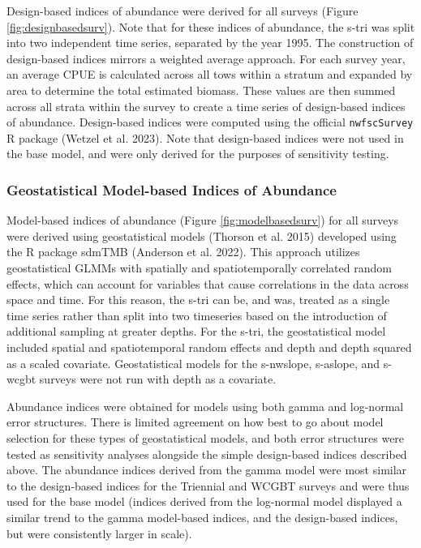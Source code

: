 \documentclass[11pt,
  english,
  letterpaper,
]{article}
\begin{document}
Design-based indices of abundance were derived for all surveys (Figure \ref{fig:designbasedsurv}). Note that for these indices of abundance, the \gls{s-tri} was split into two independent time series, separated by the year 1995. The construction of design-based indices mirrors a weighted average approach. For each survey year, an average CPUE is calculated across all tows within a stratum and expanded by area to determine the total estimated biomass. These values are then summed across all strata within the survey to create a time series of design-based indices of abundance. Design-based indices were computed using the official \texttt{nwfscSurvey} R package (Wetzel et al. 2023). Note that design-based indices were not used in the base model, and were only derived for the purposes of sensitivity testing.

\hypertarget{geostatistical-model-based-indices-of-abundance}{%
\subsubsection{Geostatistical Model-based Indices of Abundance}\label{geostatistical-model-based-indices-of-abundance}}

Model-based indices of abundance (Figure \ref{fig:modelbasedsurv}) for all surveys were derived using geostatistical models (Thorson et al. 2015) developed using the R package sdmTMB (Anderson et al. 2022). This approach utilizes geostatistical GLMMs with spatially and spatiotemporally correlated random effects, which can account for variables that cause correlations in the data across space and time. For this reason, the \gls{s-tri} can be, and was, treated as a single time series rather than split into two timeseries based on the introduction of additional sampling at greater depths. For the \gls{s-tri}, the geostatistical model included spatial and spatiotemporal random effects and depth and depth squared as a scaled covariate. Geostatistical models for the \gls{s-nwslope}, \gls{s-aslope}, and \gls{s-wcgbt} surveys were not run with depth as a covariate.

Abundance indices were obtained for models using both gamma and log-normal error structures. There is limited agreement on how best to go about model selection for these types of geostatistical models, and both error structures were tested as sensitivity analyses alongside the simple design-based indices described above. The abundance indices derived from the gamma model were most similar to the design-based indices for the Triennial and WCGBT surveys and were thus used for the base model (indices derived from the log-normal model displayed a similar trend to the gamma model-based indices, and the design-based indices, but were consistently larger in scale).
\end{document}
